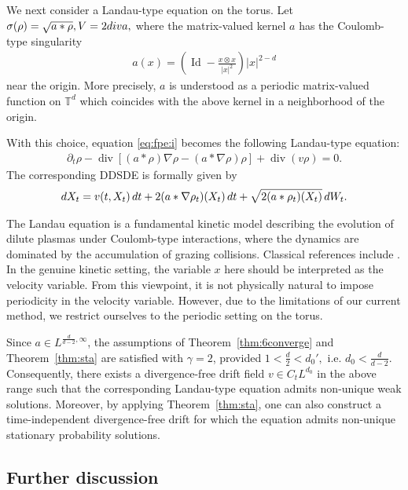 \documentclass[10pt,a4paper]{amsart}
\numberwithin{equation}{section}
\def\dif{{\mathord{{\rm d}}}}
\def\div{\mathord{{\rm div}}}
\def\dif{{\mathord{{\rm d}}}}
\def\div{\mathord{{\rm div}}}
\begin{document}
We next consider a Landau-type equation on the torus. Let
$
\sigma(\rho)=\sqrt{a*\rho},
V=2\div a,
$
where the matrix-valued kernel $a$ has the Coulomb-type singularity
\begin{align*}
a(x)
=
\left(
\operatorname{Id}
-
\frac{x\otimes x}{|x|^2}
\right)
|x|^{2-d}
\end{align*}
near the origin. More precisely, $a$ is understood as a periodic
matrix-valued function on $\mathbb{T}^d$ which coincides with the above
kernel in a neighborhood of the origin.  

With this choice, equation \eqref{eq:fpe:i} becomes the following
Landau-type equation:
\begin{align*}
\partial_t\rho
-
\operatorname{div}
\left[
(a*\rho)\nabla\rho
-
(a*\nabla\rho)\rho
\right]
+
\operatorname{div}(v\rho)
=
0 .
\end{align*}
The corresponding DDSDE is formally given by
\begin{align*}
\dif X_t
=
v(t,X_t)\,\dif t
+
2(a*\nabla\rho_t)(X_t)\,\dif t
+
\sqrt{2 (a*\rho_t)(X_t)}\,\dif W_t .
\end{align*} 

The Landau equation is a fundamental kinetic model describing the evolution of
dilute plasmas under Coulomb-type interactions, where the dynamics are
dominated by the accumulation of grazing collisions. Classical references
include \cite{Lan36,Vil98,Vil02}. In the genuine kinetic setting, the variable
$x$ here should be interpreted as the velocity variable. From this viewpoint,
it is not physically natural to impose periodicity in the velocity variable.
However, due to the limitations of our current method, we restrict ourselves
to the periodic setting on the torus.

Since  $
a\in
L^{\frac{d}{d-2},\infty} $,  the assumptions of Theorem~\ref{thm:6converge} and
Theorem~\ref{thm:sta} are satisfied with $\gamma=2$, provided
$
1<\frac{d}{2}<d_0',
$ i.e. $d_0<\frac{d}{d-2}$.
Consequently, there exists a divergence-free drift field
$
v\in C_tL^{d_0} 
$
 in the above range such that the corresponding Landau-type
equation admits non-unique weak solutions. Moreover, by applying
Theorem~\ref{thm:sta}, one can also construct a time-independent
divergence-free drift
for which the  equation admits non-unique
stationary probability solutions. 
 
\subsection{Further discussion}
\end{document}
